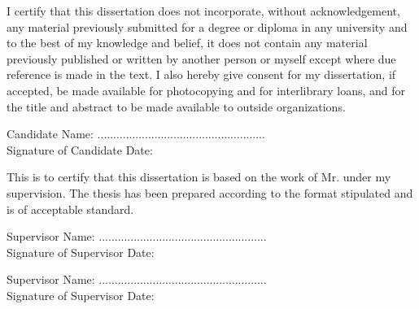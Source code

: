 \newcommand{\declarationSign}[3] {
	\bigbreak
	\noindent
	#3 Name: #1
	\bigbreak
	\noindent
	.....................................................\\
	Signature of #3	\qquad\qquad\qquad\qquad\qquad\qquad Date: #2
	
	\bigbreak
}

	\noindent
	I certify that this dissertation does not incorporate, without acknowledgement, any material previously submitted for a degree or diploma in any university and to the best of my knowledge and belief, it does not contain any material previously published or written by another person or myself except where due reference is made in the text. I also hereby give consent for my dissertation, if accepted, be made available for photocopying and for interlibrary loans, and for the title and abstract to be made available to outside organizations.

	\declarationSign{\NAME}{\DATE}{Candidate}
	\noindent
	This is to certify that this dissertation is based on the work of Mr. \NAME\hspace{0.1cm} under my supervision. The thesis has been prepared according to the format stipulated and is of acceptable standard.
	\declarationSign{\SUPERVISOR}{\DATE}{Supervisor}
	\declarationSign{\COSUPERVISOR}{\DATE}{Supervisor}